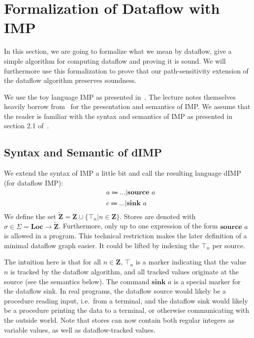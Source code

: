 \section{Formalization of Dataflow with IMP}

In this section, we are going to formalize what we mean by dataflow,
give a simple algorithm for computing dataflow and proving it is sound.
We will furthermore use this formalization to prove that our
path-sensitivity extension of the dataflow algorithm preserves soundness.

We use the toy language IMP as presented in~\cite{sat}.
The lecture notes themselves heavily borrow from~\cite{fsopl} for the
presentation and semantics of IMP.
We assume that the reader is familiar with the syntax and semantics of IMP
as presented in section 2.1 of~\cite{sat}.

\subsection{Syntax and Semantic of dIMP}
We extend the syntax of IMP a little bit
and call the resulting language dIMP (for dataflow IMP):
\begin{align*}
    &a \Coloneqq \dots | \textbf{source } a\\
    &c \Coloneqq \dots | \textbf{sink } a\\
\end{align*}
We define the set $\tilde{\textbf{Z}} = \textbf{Z} \cup \{\top_n | n \in \textbf{Z}\}$.
Stores are denoted with $\sigma \in \Sigma = \textbf{Loc} \to \tilde{\textbf{Z}}$.
Furthermore, only up to one expression of the form $\textbf{source } a$ is allowed
in a program.
This technical restriction makes the later definition of a minimal dataflow graph
easier. It could be lifted by indexing the $\top_n$ per source.

The intuition here is that for all $n \in \textbf{Z}$, $\top_n$
is a marker indicating that the value $n$ is tracked by the dataflow algorithm,
and all tracked values originate at the source (see the semantics below).
The command $\textbf{sink } a$ is a special marker for the dataflow sink.
In real programs, the dataflow source would likely be a procedure reading input,
i.e.\ from a terminal, and the dataflow sink would likely be a procedure 
printing the data to a terminal, or otherwise communicating with the outside world.
Note that stores can now contain both regular integers as variable values,
as well as dataflow-tracked values.

